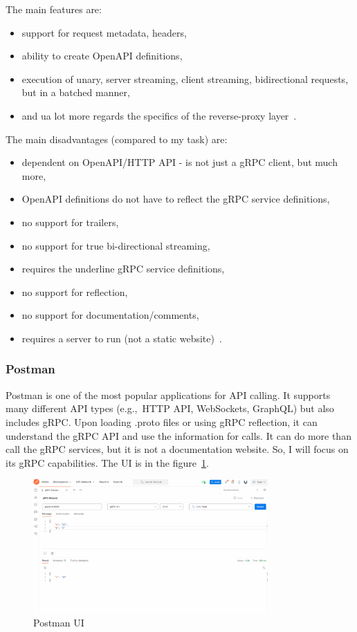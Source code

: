 The main features are:
\begin{itemize}
    \item support for request metadata, headers,
    \item ability to create OpenAPI definitions,
    \item execution of unary, server streaming, client streaming, bidirectional requests, but in a batched manner,
    \item and ua lot more regards the specifics of the reverse-proxy layer~\cite{grpc-gateway}.
\end{itemize}

The main disadvantages (compared to my task) are:
\begin{itemize}
    \item dependent on OpenAPI/HTTP API - is not just a gRPC client, but much more,
    \item OpenAPI definitions do not have to reflect the gRPC service definitions,
    \item no support for trailers,
    \item no support for true bi-directional streaming,
    \item requires the underline gRPC service definitions,
    \item no support for reflection,
    \item no support for documentation/comments,
    \item requires a server to run (not a static website)~\cite{grpc-gateway}.
\end{itemize}

\subsubsection{Postman}
Postman is one of the most popular applications for API calling.
It supports many different API types (e.g.,\ HTTP API, WebSockets, GraphQL) but also includes gRPC\@.
Upon loading .proto files or using gRPC reflection, it can understand the gRPC API and use the information for calls.
It can do more than call the gRPC services, but it is not a documentation website.
So, I will focus on its gRPC capabilities.
The UI is in the figure~\ref{fig:postman}.
\cite{postman}

\begin{figure}[hbt!]
    \centering
    \captionsetup{justification=centering}
    \includegraphics[width=0.8\textwidth]{images/postman}
    \caption{Postman UI~\cite{postman}}
    \label{fig:postman}
\end{figure}

